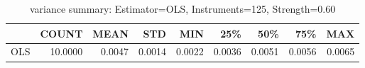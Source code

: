 \begin{table}[ht]
\centering
\caption{variance summary: Estimator=OLS, Instruments=125, Strength=0.60}
\begin{tabular}{lrrrrrrrr}
\toprule
 & COUNT & MEAN & STD & MIN & 25\% & 50\% & 75\% & MAX \\
\midrule
OLS & 10.0000 & 0.0047 & 0.0014 & 0.0022 & 0.0036 & 0.0051 & 0.0056 & 0.0065 \\
\bottomrule
\end{tabular}
\end{table}
